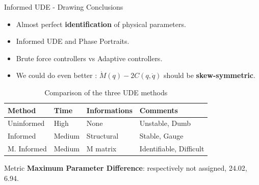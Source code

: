 \begin{frame} {Informed UDE - Drawing Conclusions}
    \begin{itemize}      
        \item Almost perfect \textbf{identification} of physical parameters.
        \item Informed UDE and  Phase Portraits.
        \item Brute force controllers vs Adaptive controllers.
        \item We could do even better : $\dot{M}(q) - 2C(q, \dot{q})$ should be \textbf{skew-symmetric}. 
    \end{itemize}
    \vspace{1em}
    \begin{table}[h]
        \centering
        \caption{Comparison of the three UDE methods}
        \label{tab: metodi}
        \begin{tabular}{ p{3cm} p{2cm} p{2cm} p{4cm} }
            \toprule
            \textbf{Method} & \textbf{Time} & \textbf{Informations} & \textbf{Comments} \\
            \midrule
                Uninformed      & High                  & None                       & Unstable, Dumb    \\
                Informed      & Medium                 & Structural            & Stable, Gauge            \\
                M. Informed       & Medium                 & M matrix                    & Identifiable, Difficult       \\
            \bottomrule
        \end{tabular}
        
        \begin{block}{Metric}
            \textbf{Maximum Parameter Difference}: respectively not assigned, 24.02, 6.94.
        \end{block}
    \end{table}
\end{frame}




